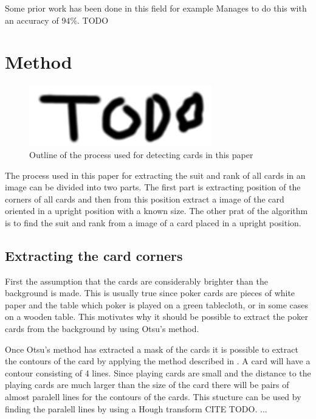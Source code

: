 \documentclass[journal,twoside]{IEEEtran}
\begin{document}
Some prior work has been done in this field for example \cite{PokerVision} Manages to do this with an accuracy of $94\%$.
TODO


\section{Method}

\begin{figure}[placement h]
\centering
\includegraphics[scale=0.4, trim= 0cm 0cm 0cm 0cm]{TODO.png}
\caption{Outline of the process used for detecting cards in this paper}
\label{fig:AlgOutline}
\end{figure}

The process used in this paper for extracting the suit and rank of all cards in an image can be divided into two parts. The first part is extracting position of the corners of all cards and then from this position extract a image of the card oriented in a upright position with a known size. The other prat of the algorithm is to find the suit and rank from a image of a card placed in a upright position.

\subsection{Extracting the card corners}

First the assumption that the cards are considerably brighter than the background is made. This is usually true since poker cards are pieces of white paper and the table which poker is played on a green tablecloth, or in some cases on a wooden table.
This motivates why it should be possible to extract the poker cards from the background by using Otsu's method\cite{OTSU}.

Once Otsu's method has extracted a mask of the cards it is possible to extract the contours of the card by applying the method described in \cite{CONTOURS}. A card will have a contour consisting of 4 lines. Since playing cards are small and the distance to the playing cards are much larger than the size of the card there will be pairs of almost paralell lines for the contours of the cards. This stucture can be used by finding the paralell lines by using a Hough transform CITE TODO. ...
\end{document}
